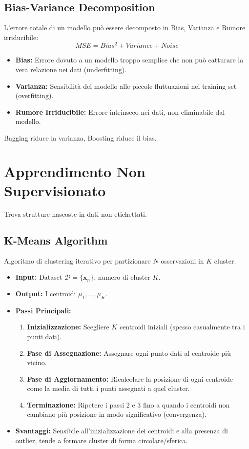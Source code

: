 \documentclass[a4paper,11pt]{article}
\begin{document}
\subsection{Bias-Variance Decomposition}
L'errore totale di un modello può essere decomposto in Bias, Varianza e Rumore irriducibile:
\begin{equation}
    MSE = Bias^2 + Variance + Noise
\end{equation}
\begin{itemize}
    \item \textbf{Bias:} Errore dovuto a un modello troppo semplice che non può catturare la vera relazione nei dati (underfitting).
    \item \textbf{Varianza:} Sensibilità del modello alle piccole fluttuazioni nel training set (overfitting).
    \item \textbf{Rumore Irriducibile:} Errore intrinseco nei dati, non eliminabile dal modello.
\end{itemize}
Bagging riduce la varianza, Boosting riduce il bias.

\section{Apprendimento Non Supervisionato}

Trova strutture nascoste in dati non etichettati.

\subsection{K-Means Algorithm}
Algoritmo di clustering iterativo per partizionare $N$ osservazioni in $K$ cluster.
\begin{itemize}
    \item \textbf{Input:} Dataset $\mathcal{D} = \{\mathbf{x}_n\}$, numero di cluster $K$.
    \item \textbf{Output:} I centroidi $\mu_1, \ldots, \mu_K$.
    \item \textbf{Passi Principali:}
    \begin{enumerate}
        \item \textbf{Inizializzazione:} Scegliere $K$ centroidi iniziali (spesso casualmente tra i punti dati).
        \item \textbf{Fase di Assegnazione:} Assegnare ogni punto dati al centroide più vicino.
        \item \textbf{Fase di Aggiornamento:} Ricalcolare la posizione di ogni centroide come la media di tutti i punti assegnati a quel cluster.
        \item \textbf{Terminazione:} Ripetere i passi 2 e 3 fino a quando i centroidi non cambiano più posizione in modo significativo (convergenza).
    \end{enumerate}
    \item \textbf{Svantaggi:} Sensibile all'inizializzazione dei centroidi e alla presenza di outlier, tende a formare cluster di forma circolare/sferica.
\end{itemize}
\end{document}
